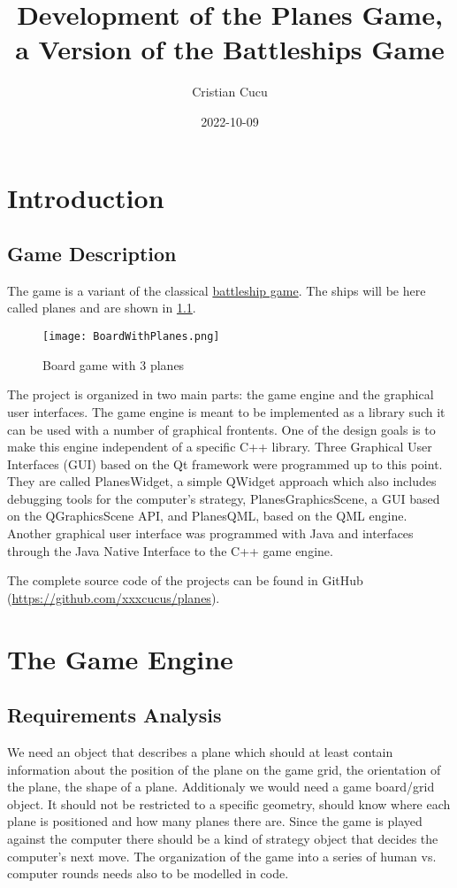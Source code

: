 \documentclass{report}
\title{Development of the Planes Game, a Version of the Battleships Game}
\date{2022-10-09}
\author{Cristian Cucu}
\begin{document}
\maketitle
\newpage
\lstset{language=C++}
\tableofcontents

\chapter{Introduction}

\section{Game Description}
The game is a variant of the classical \href{https://en.wikipedia.org/wiki/Battleship_(game)}{battleship game}. The ships will be here called planes and are shown in \ref{fig:board}.
\begin{figure}[h]
  \texttt{[image: BoardWithPlanes.png]}
  \caption{Board game with 3 planes}
  \label{fig:board}
\end{figure}
The project is organized in two main parts: the game engine and the graphical user interfaces. The game engine is meant to be implemented as a library such it can be used with a number of graphical frontents. One of the design goals is to make this engine independent of a specific C++ library. Three Graphical User Interfaces (GUI) based on the Qt framework were programmed up to this point. They are called PlanesWidget, a simple QWidget approach which also includes debugging tools for the computer's strategy, PlanesGraphicsScene, a GUI based on the QGraphicsScene API, and PlanesQML, based on the QML engine. Another graphical user interface was programmed with Java and interfaces through the Java Native Interface to the C++ game engine.

The complete source code of the projects can be found in GitHub (\url{https://github.com/xxxcucus/planes}).

\chapter {The Game Engine }
\section{Requirements Analysis}
We need an object that describes a plane which should at least contain information about the position of the plane on the game grid, the orientation of the plane, the shape of a plane. Additionaly we would need a game board/grid object. It should not be restricted to a specific geometry, should know where each plane is positioned and how many planes there are. Since the game is played against the computer there should be a kind of strategy object that decides the computer's next move. The organization of the game into a series of human vs. computer rounds needs also to be modelled in code.
\end{document}
